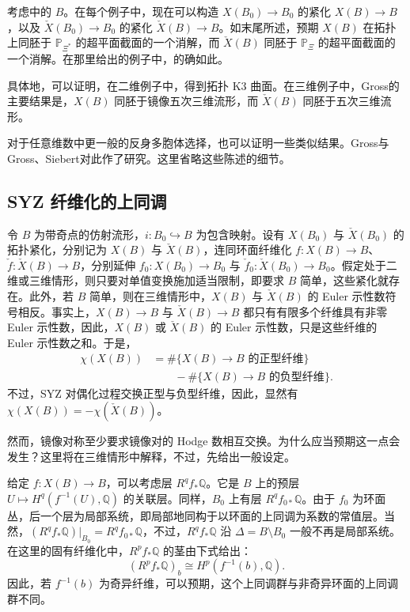 \begin{example}\label{ex:6.100}
考虑中的 $B$。在每个例子中，现在可以构造 $X(B_0)\to B_0$ 的紧化 $X(B)\to B$，以及 $\check X(B_0)\to B_0$ 的紧化 $\check X(B)\to B$。如末尾所述，预期 $X(B)$ 在拓扑上同胚于 $\mathbb P_{\Xi^*}$ 的超平面截面的一个消解，而 $\check X(B)$ 同胚于 $\mathbb P_\Xi$ 的超平面截面的一个消解。在那里给出的例子中，的确如此。

具体地，可以证明，在二维例子中，得到拓扑 K3 曲面。在三维例子中，Gross的主要结果是，$X(B)$ 同胚于镜像五次三维流形，而 $\check X(B)$ 同胚于五次三维流形。

对于任意维数中更一般的反身多胞体选择，也可以证明一些类似结果。Gross与 Gross、Siebert对此作了研究。这里省略这些陈述的细节。
\end{example}

\subsection{SYZ 纤维化的上同调}\label{sec:6.4.4}

令 $B$ 为带奇点的仿射流形，$i\colon B_0\hookrightarrow B$ 为包含映射。设有 $X(B_0)$ 与 $\check X(B_0)$ 的拓扑紧化，分别记为 $X(B)$ 与 $\check X(B)$，连同环面纤维化 $f\colon X(B)\to B$、$\check f\colon\check X(B)\to B$，分别延伸 $f_0\colon X(B_0)\to B_0$ 与 $\check f_0\colon\check X(B_0)\to B_0$。假定处于二维或三维情形，则只要对单值变换施加适当限制，即要求 $B$ 简单，这些紧化就存在。此外，若 $B$ 简单，则在三维情形中，$X(B)$ 与 $\check X(B)$ 的 Euler 示性数符号相反。事实上，$X(B)\to B$ 与 $\check X(B)\to B$ 都只有有限多个纤维具有非零 Euler 示性数，因此，$X(B)$ 或 $\check X(B)$ 的 Euler 示性数，只是这些纤维的 Euler 示性数之和。于是，
\[
\begin{aligned}
\chi(X(B))
&=\#\{X(B)\to B\text{ 的正型纤维}\}\\
&\qquad-\#\{X(B)\to B\text{ 的负型纤维}\}.
\end{aligned}
\]
不过，SYZ 对偶化过程交换正型与负型纤维，因此，显然有 $\chi(X(B))=-\chi(\check X(B))$。

然而，镜像对称至少要求镜像对的 Hodge 数相互交换。为什么应当预期这一点会发生？这里将在三维情形中解释，不过，先给出一般设定。

给定 $f\colon X(B)\to B$，可以考虑层 $R^qf_*\mathbb Q$。它是 $B$ 上的预层 $U\mapsto H^q(f^{-1}(U),\mathbb Q)$ 的关联层。同样，$B_0$ 上有层 $R^qf_{0*}\mathbb Q$。由于 $f_0$ 为环面丛，后一个层为局部系统，即局部地同构于以环面的上同调为系数的常值层。当然，$(R^qf_*\mathbb Q)|_{B_0}=R^qf_{0*}\mathbb Q$，不过，$R^qf_*\mathbb Q$ 沿 $\Delta=B\setminus B_0$ 一般不再是局部系统。在这里的固有纤维化中，$R^pf_*\mathbb Q$ 的茎由下式给出：
\[
(R^pf_*\mathbb Q)_b\cong H^p(f^{-1}(b),\mathbb Q).
\]
因此，若 $f^{-1}(b)$ 为奇异纤维，可以预期，这个上同调群与非奇异环面的上同调群不同。


